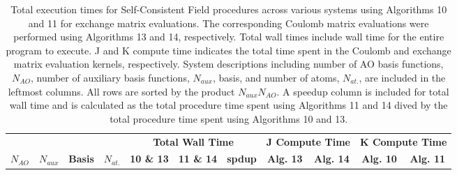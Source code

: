 \begingroup
\renewcommand{\arraystretch}{0.7}
\begin{table}[H]
\footnotesize
\centering
\renewcommand{\baselinestretch}{1}
\caption{Total execution times for Self-Consistent Field procedures across various systems using Algorithms 10 and 11 for exchange matrix evaluations. 
The corresponding Coulomb matrix evaluations were performed using Algorithms 13 and 14, respectively. Total wall times include 
wall time for the entire program to execute. J and K compute time indicates the total time spent in the Coulomb and exchange matrix
evaluation kernels, respectively. System descriptions including number of AO basis functions, $N_{AO}$, number of auxiliary basis functions,
$N_{aux}$, basis, and number of atoms, $N_{at.}$, are included in the leftmost columns. All rows are sorted by the product $N_{aux}N_{AO}$.
A speedup column is included for total wall time and is calculated as the total procedure time spent using Algorithms 11 and 14 dived by 
the total procedure time spent using Algorithms 10 and 13.
\label{tbl:practical_speedups}}
\begin{tabular}{lrrrrrrrrrr}
  \multicolumn{1}{c}{\textbf{}} 
& \multicolumn{1}{c}{\textbf{}} 
& \multicolumn{1}{c}{\textbf{}} 
& \multicolumn{1}{c}{\textbf{}} 
& \multicolumn{3}{c}{\textbf{Total Wall Time}}  
& \multicolumn{2}{c}{\textbf{J Compute Time}}  
& \multicolumn{2}{c}{\textbf{K Compute Time}} \\ 
\cline{5-7}
\cline{8-9}
\cline{10-11}
  \multicolumn{1}{c}{\textbf{$N_{AO}$}} 
& \multicolumn{1}{c}{\textbf{$N_{aux}$}} 
& \multicolumn{1}{c}{\textbf{Basis}} 
& \multicolumn{1}{c}{\textbf{$N_{at.}$}} 
& \multicolumn{1}{c}{\textbf{10 \& 13}} 
& \multicolumn{1}{c}{\textbf{11 \& 14}} 
& \multicolumn{1}{c}{\textbf{spdup}} 
& \multicolumn{1}{c}{\textbf{Alg. 13}} 
& \multicolumn{1}{c}{\textbf{Alg. 14}} 
& \multicolumn{1}{c}{\textbf{Alg. 10}} 
& \multicolumn{1}{c}{\textbf{Alg. 11}} \\ 
\hline


\end{tabular}
\end{table}
